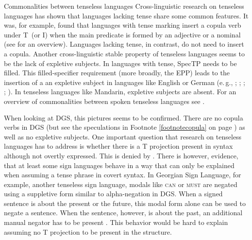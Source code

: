 \begin{digression}{Commonalities between tenseless languages}{}
\noindent Cross-linguistic research on tenseless languages has shown that languages lacking tense share some common features. It was, for example, found that languages with tense marking insert a copula verb under T\textdegree\ (or I\textdegree ) when the main predicate is formed by an adjective or a nominal (see \citealt{lin2012tenselessness} for an overview). Languages lacking tense, in contrast, do not need to insert a copula. Another cross-linguistic stable property of tenseless languages seems to be the lack of expletive subjects. In languages with tense, SpecTP needs to be filled. This filled-specifier requirement (more broadly, the EPP) leads to the insertion of a an expletive subject in languages like English or German (e.\,g., \citealt{chomsky1995categories}; \citealt{chomsky1999}; \citealt{chomsky2000minimalist}; \citealt{lasnik2001can}; \citealt{roberts2002tended}). In tenseless languages like Mandarin, expletive subjects are absent. For an overview of commonalities between spoken tenseless languages see \citet{lin2006time, lin2012tenselessness}. 

When looking at DGS, this pictures seems to be confirmed. There are no copula verbs in DGS (but see the speculations in Footnote \ref{footnotecopula} on page \pageref{footnotecopula}) as well as no expletive subjects. One important question that research on tenseless languages has to address is whether there is a T projection present in syntax although not overtly expressed. This is denied by \citet{lin2006time, lin2012tenselessness}. There is however, evidence, that at least some sign languages behave in a way that can only be explained when assuming a tense phrase in covert syntax. In Georgian Sign Language, for example, another tenseless sign language, modals like \textsc{can} or \textsc{must} are negated using a suppletive form similar to alpha-negation in DGS. When a signed sentence is about the present or the future, this modal form alone can be used to negate a sentence. When the sentence, however, is about the past, an additional manual negator has to be present \citep{makharoblizdepfau2018negationtense}. This behavior would be hard to explain assuming no T projection to be present in the structure.
\end{digression}

